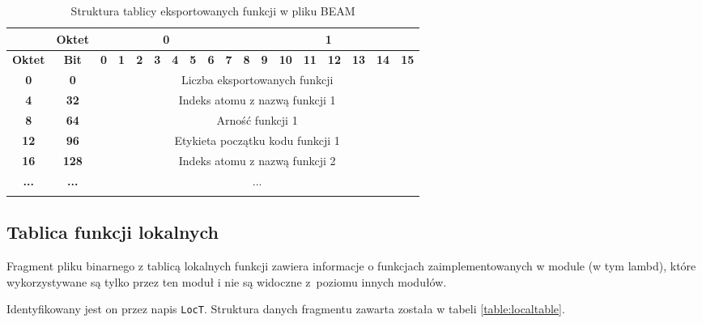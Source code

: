 \begin{longtable}{|c|c|c|c|c|c|c|c|c|c|c|c|c|c|c|c|c|c|}
\hline
         & \textbf{Oktet} & \multicolumn{8}{|c|}{\textbf{0}} & \multicolumn{8}{|c|}{\textbf{1}} \\
\hline
\textbf{Oktet} & \textbf{Bit} & \textbf{0} & \textbf{1} & \textbf{2} & \textbf{3} & \textbf{4} & \textbf{5} & \textbf{6} & \textbf{7} & \textbf{8} & \textbf{9} & \textbf{10} & \textbf{11} & \textbf{12} & \textbf{13} & \textbf{14} & \textbf{15}\\
\hline
\textbf{0} & \textbf{0} & \multicolumn{16}{|c|}{Liczba eksportowanych funkcji} \\[3ex]
\hline
\textbf{4} & \textbf{32} & \multicolumn{16}{|c|}{Indeks atomu z nazwą funkcji 1}\\[3ex]
\hline
\textbf{8} & \textbf{64} & \multicolumn{16}{|c|}{Arność funkcji 1} \\[3ex]
\hline
\textbf{12} & \textbf{96} & \multicolumn{16}{|c|}{Etykieta początku kodu funkcji 1}\\[3ex]
\hline
\textbf{16} & \textbf{128} & \multicolumn{16}{|c|}{Indeks atomu z nazwą funkcji 2}\\[3ex]
\hline
\textbf{...} & \textbf{...} & \multicolumn{16}{|c|}{...}  \\[3ex]
\hline
\caption{Struktura tablicy eksportowanych funkcji w pliku BEAM}
\label{table:exporttable} \\
\end{longtable}

\subsection{Tablica funkcji lokalnych}
Fragment pliku binarnego z tablicą lokalnych funkcji zawiera informacje o funkcjach zaimplementowanych w module (w tym lambd), które wykorzystywane są tylko przez ten moduł i nie są widoczne z~poziomu innych modułów.

Identyfikowany jest on przez napis \texttt{LocT}. Struktura danych fragmentu zawarta została w tabeli \ref{table:localtable}.

